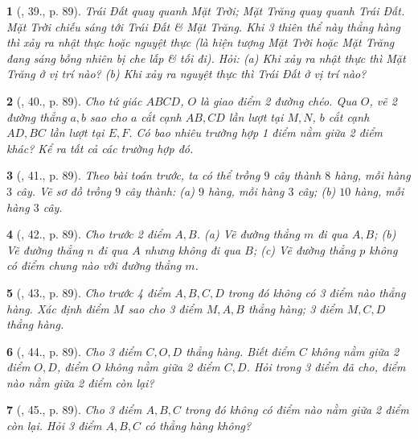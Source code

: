 \documentclass{article}
\newtheorem{baitoan}{}
\begin{document}
\begin{baitoan}[\cite{Tuyen_Toan_6}, 39., p. 89]
	Trái Đất quay quanh Mặt Trời; Mặt Trăng quay quanh Trái Đất. Mặt Trời chiếu sáng tới Trái Đất \& Mặt Trăng. Khi 3 thiên thể này thẳng hàng thì xảy ra nhật thực hoặc nguyệt thực (là hiện tượng Mặt Trời hoặc Mặt Trăng đang sáng bỗng nhiên bị che lấp \& tối đi). Hỏi: (a) Khi xảy ra nhật thực thì Mặt Trăng ở vị trí nào? (b) Khi xảy ra nguyệt thực thì Trái Đất ở vị trí nào?
\end{baitoan}

\begin{baitoan}[\cite{Tuyen_Toan_6}, 40., p. 89]
	Cho tứ giác $ABCD$, $O$ là giao điểm 2 đường chéo. Qua $O$, vẽ 2 đường thẳng $a,b$ sao cho $a$ cắt cạnh $AB,CD$ lần lượt tại $M,N$, $b$ cắt cạnh $AD,BC$ lần lượt tại $E,F$. Có bao nhiêu trường hợp 1 điểm nằm giữa 2 điểm khác? Kể ra tất cả các trường hợp đó.
\end{baitoan}

\begin{baitoan}[\cite{Tuyen_Toan_6}, 41., p. 89]
	Theo bài toán trước, ta có thể trồng $9$ cây thành $8$ hàng, mỗi hàng $3$ cây. Vẽ sơ đồ trồng $9$ cây thành: (a) $9$ hàng, mỗi hàng $3$ cây; (b) $10$ hàng, mỗi hàng $3$ cây.
\end{baitoan}

\begin{baitoan}[\cite{Tuyen_Toan_6}, 42., p. 89]
	Cho trước 2 điểm $A,B$. (a) Vẽ đường thẳng $m$ đi qua $A,B$; (b) Vẽ đường thẳng $n$ đi qua $A$ nhưng không đi qua $B$; (c) Vẽ đường thẳng $p$ không có điểm chung nào với đường thẳng $m$.
\end{baitoan}

\begin{baitoan}[\cite{Tuyen_Toan_6}, 43., p. 89]
	Cho trước 4 điểm $A,B,C,D$ trong đó không có 3 điểm nào thẳng hàng. Xác định điểm $M$ sao cho 3 điểm $M,A,B$ thẳng hàng; 3 điểm $M,C,D$ thẳng hàng.
\end{baitoan}

\begin{baitoan}[\cite{Tuyen_Toan_6}, 44., p. 89]
	Cho 3 điểm $C,O,D$ thẳng hàng. Biết điểm $C$ không nằm giữa 2 điểm $O,D$, điểm $O$ không nằm giữa 2 điểm $C,D$. Hỏi trong 3 điểm đã cho, điểm nào nằm giữa 2 điểm còn lại?
\end{baitoan}

\begin{baitoan}[\cite{Tuyen_Toan_6}, 45., p. 89]
	Cho 3 điểm $A,B,C$ trong đó không có điểm nào nằm giữa 2 điểm còn lại. Hỏi 3 điểm $A,B,C$ có thẳng hàng không?
\end{baitoan}
\end{document}

